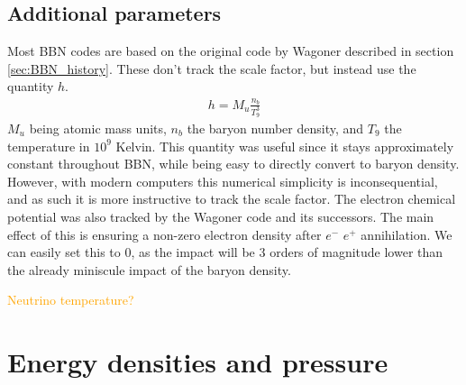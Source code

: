 \subsection{Additional parameters}
Most BBN codes are based on the original code by Wagoner described in section \ref{sec:BBN_history}. These don't track the scale factor, but instead use the quantity $h$.
\begin{align}
    h=M_u\frac{n_{b}}{T^3_9}
\end{align}
$M_u$ being atomic mass units, $n_b$ the baryon number density, and  $T_9$ the temperature in $10^9$ Kelvin. This quantity was useful since it stays approximately constant throughout BBN, while being easy to directly convert to baryon density. However, with modern computers this numerical simplicity is inconsequential, and as such it is more instructive to track the scale factor.
The electron chemical potential was also tracked by the Wagoner code and its successors. The main effect of this is ensuring a non-zero electron density after $e^-$ $e^+$ annihilation. We can easily set this to 0, as the impact will be 3 orders of magnitude lower than the already miniscule impact of the baryon density.

\textcolor{orange}{Neutrino temperature?}


\section{Energy densities and pressure}

